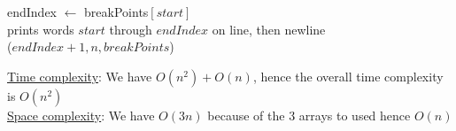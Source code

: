 \begin{customsolutionbox}
\begin{algorithm}[H]
{            endIndex $\gets$ breakPoints$[start]$ \\
            prints words $start$ through $endIndex$ on line, then newline \\
            \FPrintParagraph($endIndex+ 1, n, breakPoints$)
        }
    \end{algorithm}

    \vspace{0.5em}
    \underline{Time complexity}: We have $O(n^2) + O(n)$, hence the overall time complexity is $O(n^2)$ \\
    \underline{Space complexity}: We have $O(3n)$ because of the 3 arrays to used hence $O(n)$ \\
\end{customsolutionbox}